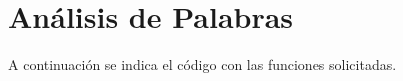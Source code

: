 \section{Análisis de Palabras}

  A continuación se indica el código con las funciones
  solicitadas.
  
    
    